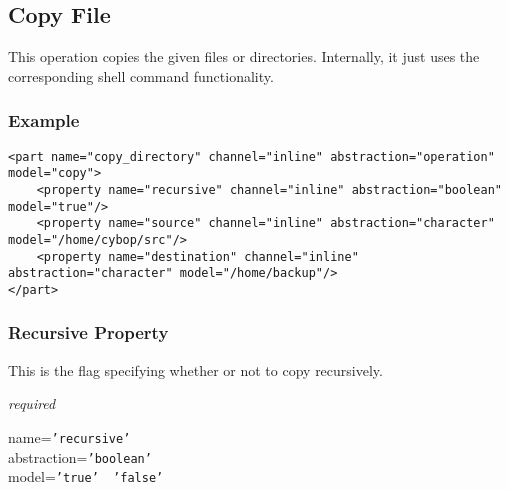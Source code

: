 %
%
%
%
%
%

\subsection{Copy File}
\label{copy_file_heading}

This operation copies the given files or directories. Internally, it just uses
the corresponding shell command functionality.

\subsubsection{Example}

\begin{scriptsize}
    \begin{verbatim}
<part name="copy_directory" channel="inline" abstraction="operation" model="copy">
    <property name="recursive" channel="inline" abstraction="boolean" model="true"/>
    <property name="source" channel="inline" abstraction="character" model="/home/cybop/src"/>
    <property name="destination" channel="inline" abstraction="character" model="/home/backup"/>
</part>
    \end{verbatim}
\end{scriptsize}

\subsubsection{Recursive Property}

This is the flag specifying whether or not to copy recursively.

\emph{required}

name=\texttt{'recursive'}\\
abstraction=\texttt{'boolean'}\\
model=\texttt{'true' \vline\ 'false'}

